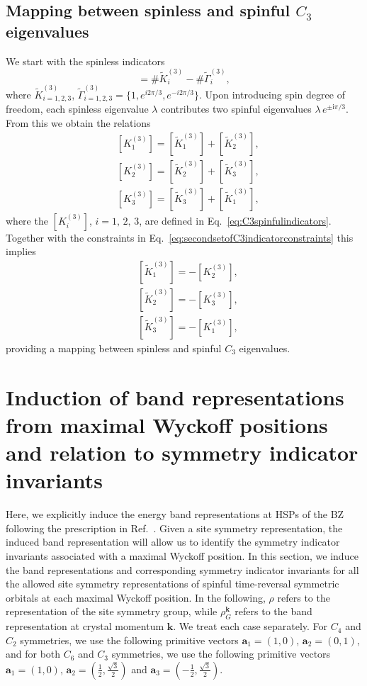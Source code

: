 {\section{Mapping between spinless and spinful $C_3$ eigenvalues}
\label{sec:C3appendix}
We start with the spinless indicators
\begin{equation}
[\tilde{K}^{(3)}_i]= \#\tilde{K}^{(3)}_i - \#\tilde{\Gamma}^{(3)}_i,
\end{equation}
where $\tilde{K}^{(3)}_{i=1,2,3}$, $\tilde{\Gamma}^{(3)}_{i=1,2,3}=\{1,e^{i 2\pi/3},e^{-i 2\pi/3}\}$. Upon introducing spin degree of freedom, each spinless eigenvalue $\lambda$ contributes two spinful eigenvalues $\lambda \, e^{\pm \mathrm{i} \pi/3}$. From this we obtain the relations
\begin{equation}
\begin{aligned}
&[K^{(3)}_1]=[\tilde{K}^{(3)}_1]+[\tilde{K}^{(3)}_2], \\
&[K^{(3)}_2]=[\tilde{K}^{(3)}_2]+[\tilde{K}^{(3)}_3], \\
&[K^{(3)}_3]=[\tilde{K}^{(3)}_3]+[\tilde{K}^{(3)}_1],
\end{aligned}
\end{equation}
where the $[K^{(3)}_i]$, $i=1, \, 2, \, 3$, are defined in Eq.~\eqref{eq:C3spinfulindicators}. Together with the constraints in Eq.~\eqref{eq:secondsetofC3indicatorconstraints} this implies
\begin{equation}
\begin{aligned}
&[\tilde{K}^{(3)}_1]=-[K^{(3)}_2], \\
&[\tilde{K}^{(3)}_2]=-[K^{(3)}_3], \\
&[\tilde{K}^{(3)}_3]=-[K^{(3)}_1],
\end{aligned}
\end{equation}
providing a mapping between spinless and spinful $C_3$ eigenvalues.

\chapter{Induction of band representations from maximal Wyckoff positions and relation to symmetry indicator invariants}
\label{sec:inductionEBRs}
Here, we explicitly induce the energy band representations at HSPs of the BZ following the prescription in Ref.~\cite{Cano17-2}. Given a site symmetry representation, the induced band representation will allow us to identify the symmetry indicator invariants associated with a maximal Wyckoff position. In this section, we induce the band representations and corresponding symmetry indicator invariants for all the allowed site symmetry representations of spinful time-reversal symmetric orbitals at each maximal Wyckoff position.
In the following, $\rho$ refers to the representation of the site symmetry group, while $\rho^{\mathbf{k}}_G$ refers to the band representation at crystal momentum $\mathbf{k}$. We treat each case separately. For $C_4$ and $C_2$ symmetries, we use the following primitive vectors $\mathbf{a}_1=(1,0)$, $\mathbf{a}_2=(0,1)$, and for both $C_6$ and $C_3$ symmetries, we use the following primitive vectors $\mathbf{a}_1=(1,0)$, $\mathbf{a}_{2}=( \frac{1}{2}, \frac{\sqrt{3}}{2})$ and $\mathbf{a}_{3}=(- \frac{1}{2}, \frac{\sqrt{3}}{2})$.

}
